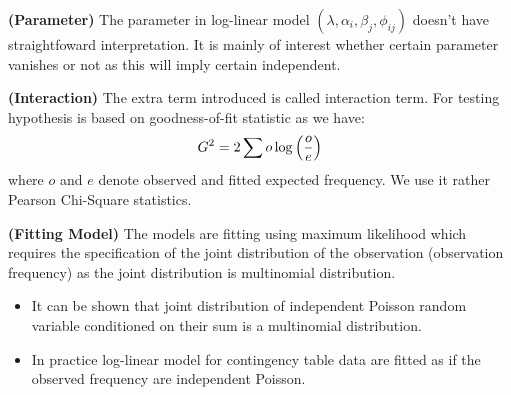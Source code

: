 \begin{remark}{\textbf{(Parameter)}}
    The parameter in log-linear model $(\lambda, \alpha_i, \beta_j, \phi_{ij})$ doesn't have straightfoward interpretation. It is mainly of interest whether certain parameter vanishes or not as this will imply certain independent. 
\end{remark}

\begin{remark}{\textbf{(Interaction)}}
    The extra term introduced is called interaction term. For testing hypothesis is based on goodness-of-fit statistic as we have:
    \begin{equation*}
        G^2 = 2\sum o \log \left( \frac{o}{e} \right)
    \end{equation*}
    where $o$ and $e$ denote observed and fitted expected frequency. We use it rather Pearson Chi-Square statistics. 
\end{remark}

\begin{remark}{\textbf{(Fitting Model)}}
    The models are fitting using maximum likelihood which requires the specification of the joint distribution of the observation (observation frequency) as the joint distribution is multinomial distribution.
    \begin{itemize}
        \item It can be shown that joint distribution of independent Poisson random variable conditioned on their sum is a multinomial distribution. 
        \item In practice log-linear model for contingency table data are fitted as if the observed frequency are independent Poisson.
    \end{itemize}
\end{remark}

